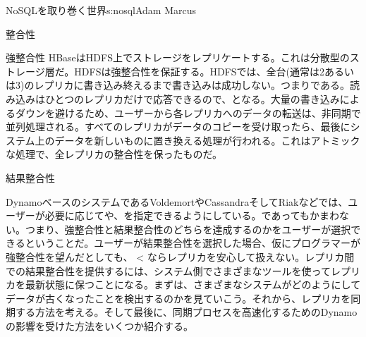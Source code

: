 \begin{aosachapter}{NoSQLを取り巻く世界}{s:nosql}{Adam Marcus}
\begin{aosasect1}{整合性}
\begin{aosasect2}{強整合性}
HBaseはHDFS上でストレージをレプリケートする。これは分散型のストレージ層だ。HDFSは強整合性を保証する。HDFSでは、全台(通常は2あるいは3)のレプリカに書き込み終えるまで書き込みは成功しない。つまりである。読み込みはひとつのレプリカだけで応答できるので、となる。大量の書き込みによるダウンを避けるため、ユーザーから各レプリカへのデータの転送は、非同期で並列処理される。すべてのレプリカがデータのコピーを受け取ったら、最後にシステム上のデータを新しいものに置き換える処理が行われる。これはアトミックな処理で、全レプリカの整合性を保ったものだ。

\end{aosasect2}

\begin{aosasect2}{結果整合性}

DynamoベースのシステムであるVoldemortやCassandraそしてRiakなどでは、ユーザーが必要に応じてや、を指定できるようにしている。であってもかまわない。つまり、強整合性と結果整合性のどちらを達成するのかをユーザーが選択できるということだ。ユーザーが結果整合性を選択した場合、仮にプログラマーが強整合性を望んだとしても、 {\textless} ならレプリカを安心して扱えない。レプリカ間での結果整合性を提供するには、システム側でさまざまなツールを使ってレプリカを最新状態に保つことになる。まずは、さまざまなシステムがどのようにしてデータが古くなったことを検出するのかを見ていこう。それから、レプリカを同期する方法を考える。そして最後に、同期プロセスを高速化するためのDynamoの影響を受けた方法をいくつか紹介する。


\end{aosasect2}
\end{aosasect1}
\end{aosachapter}
